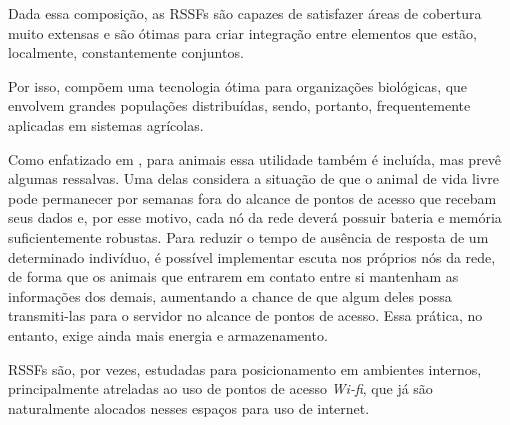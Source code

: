 Dada essa composição, as RSSFs são capazes de satisfazer áreas de cobertura muito extensas e são ótimas para criar integração entre elementos que estão, localmente, constantemente conjuntos.

Por isso, compõem uma tecnologia ótima para organizações biológicas, que envolvem grandes populações distribuídas, sendo, portanto, frequentemente aplicadas em sistemas agrícolas.

Como enfatizado em \cite{handcock}, para animais essa utilidade também é incluída, mas prevê algumas ressalvas. Uma delas considera a situação de que o animal de vida livre pode permanecer por semanas fora do alcance de pontos de acesso que recebam seus dados e, por esse motivo, cada nó da rede deverá possuir bateria e memória suficientemente robustas. Para reduzir o tempo de ausência de resposta de um determinado indivíduo, é possível implementar escuta nos próprios nós da rede, de forma que os animais que entrarem em contato entre si mantenham as informações dos demais, aumentando a chance de que algum deles possa transmiti-las para o servidor no alcance de pontos de acesso. Essa prática, no entanto, exige ainda mais energia e armazenamento.

RSSFs são, por vezes, estudadas para posicionamento em ambientes internos, principalmente atreladas ao uso de pontos de acesso \emph{Wi-fi}, que já são naturalmente alocados nesses espaços para uso de internet.

